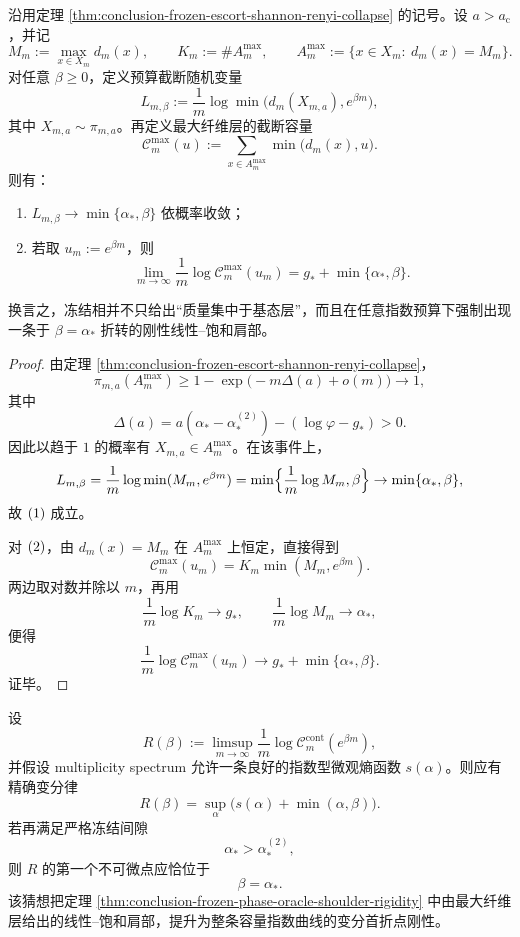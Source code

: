 \begin{theorem}[冻结相中的预言机肩部刚性]\label{thm:conclusion-frozen-phase-oracle-shoulder-rigidity}
沿用定理 \ref{thm:conclusion-frozen-escort-shannon-renyi-collapse} 的记号。设 \(a>a_{\mathrm c}\)，并记
\[
M_m:=\max_{x\in X_m}d_m(x),
\qquad
K_m:=\#A_m^{\max},
\qquad
A_m^{\max}:=\{x\in X_m:\ d_m(x)=M_m\}.
\]
对任意 \(\beta\ge 0\)，定义预算截断随机变量
\[
L_{m,\beta}:=\frac1m\log \min\bigl(d_m(X_{m,a}),e^{\beta m}\bigr),
\]
其中 \(X_{m,a}\sim \pi_{m,a}\)。再定义最大纤维层的截断容量
\[
\mathcal C_m^{\max}(u):=\sum_{x\in A_m^{\max}}\min\bigl(d_m(x),u\bigr).
\]
则有：
\begin{enumerate}
  \item \(L_{m,\beta}\to \min\{\alpha_\ast,\beta\}\) 依概率收敛；
  \item 若取 \(u_m:=e^{\beta m}\)，则
  \[
  \lim_{m\to\infty}\frac1m\log \mathcal C_m^{\max}(u_m)
  =
  g_\ast+\min\{\alpha_\ast,\beta\}.
  \]
\end{enumerate}
换言之，冻结相并不只给出“质量集中于基态层”，而且在任意指数预算下强制出现一条于 \(\beta=\alpha_\ast\) 折转的刚性线性--饱和肩部。
\end{theorem}
\begin{proof}
由定理 \ref{thm:conclusion-frozen-escort-shannon-renyi-collapse}，
\[
\pi_{m,a}(A_m^{\max})
\ge
1-\exp\!\bigl(-m\Delta(a)+o(m)\bigr)
\to 1,
\]
其中
\[
\Delta(a)=a(\alpha_\ast-\alpha_\ast^{(2)})-(\log\varphi-g_\ast)>0.
\]
因此以趋于 \(1\) 的概率有 \(X_{m,a}\in A_m^{\max}\)。在该事件上，
\[
L_{m,\beta}
=
\frac1m\log \min(M_m,e^{\beta m})
=
\min\Bigl\{\frac1m\log M_m,\beta\Bigr\}
\to
\min\{\alpha_\ast,\beta\},
\]
故 \(\textup{(1)}\) 成立。

对 \(\textup{(2)}\)，由 \(d_m(x)=M_m\) 在 \(A_m^{\max}\) 上恒定，直接得到
\[
\mathcal C_m^{\max}(u_m)
=
K_m\min(M_m,e^{\beta m}).
\]
两边取对数并除以 \(m\)，再用
\[
\frac1m\log K_m\to g_\ast,
\qquad
\frac1m\log M_m\to \alpha_\ast,
\]
便得
\[
\frac1m\log \mathcal C_m^{\max}(u_m)
\to
g_\ast+\min\{\alpha_\ast,\beta\}.
\]
证毕。
\end{proof}

\begin{conjecture}[总容量指数的第一折点由基态指数唯一锁定]\label{conj:conclusion-total-capacity-exponent-first-kink-groundstate-locked}
设
\[
R(\beta):=\limsup_{m\to\infty}\frac1m\log \mathcal C_m^{\mathrm{cont}}(e^{\beta m}),
\]
并假设 multiplicity spectrum 允许一条良好的指数型微观熵函数 \(s(\alpha)\)。则应有精确变分律
\[
R(\beta)=\sup_{\alpha}\bigl(s(\alpha)+\min(\alpha,\beta)\bigr).
\]
若再满足严格冻结间隙
\[
\alpha_\ast>\alpha_\ast^{(2)},
\]
则 \(R\) 的第一个不可微点应恰位于
\[
\beta=\alpha_\ast.
\]
该猜想把定理 \ref{thm:conclusion-frozen-phase-oracle-shoulder-rigidity} 中由最大纤维层给出的线性--饱和肩部，提升为整条容量指数曲线的变分首折点刚性。
\end{conjecture}

